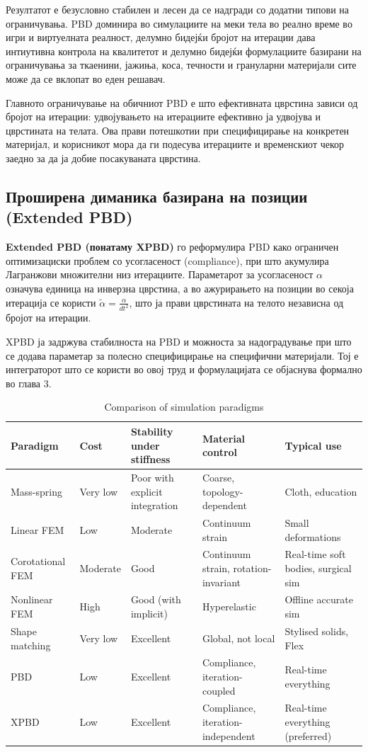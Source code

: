 Резултатот е безусловно стабилен и лесен да се надгради со додатни типови на ограничувања. PBD доминира во симулациите на меки тела во реално време во игри и виртуелната реалност, делумно бидејќи бројот на итерации дава интиутивна контрола на квалитетот и делумно бидејќи формулациите базирани на ограничувања за ткаенини, јажиња, коса, течности и грануларни материјали сите може да се вклопат во еден решавач.

Главното ограничување на обичниот PBD е што ефективната цврстина зависи од бројот на итерации: удвојувањето на итерациите ефективно ја удвојува и цврстината на телата. Ова прави потешкотии при специфицирање на конкретен материјал, и корисникот мора да ги подесува итерациите и временскиот чекор заедно за да ја добие посакуваната цврстина.

\subsection{Проширена диманика базирана на позиции (Extended PBD)}
\textbf{Extended PBD (понатаму XPBD)} го реформулира PBD како ограничен оптимизациски проблем со усогласеност (compliance), при што акумулира Лагранжови множителни низ итерациите. Параметарот за усогласеност $\alpha$ означува единица на инверзна цврстина, а во ажурирањето на позиции во секоја итерација се користи $\tilde{\alpha} = \frac{\alpha}{dt^2}$, што ја прави цврстината на телото независна од бројот на итерации. 

XPBD ја задржува стабилноста на PBD и можноста за надоградување при што се додава параметар за полесно специфицирање на специфични материјали. Тој е интеграторот што се користи во овој труд и формулацијата се објаснува формално во глава 3.

\begin{table}[h]
	\centering
	\begin{tabularx}{\textwidth}{lXXXX}
		\toprule
		\textbf{Paradigm} & \textbf{Cost} & \textbf{Stability under stiffness} & \textbf{Material control} & \textbf{Typical use} \\
		\midrule
		Mass-spring & Very low & Poor with explicit integration & Coarse, topology-dependent & Cloth, education \\
		Linear FEM & Low & Moderate & Continuum strain & Small deformations \\
		Corotational FEM & Moderate & Good & Continuum strain, rotation-invariant & Real-time soft bodies, surgical sim \\
		Nonlinear FEM & High & Good (with implicit) & Hyperelastic & Offline accurate sim \\
		Shape matching & Very low & Excellent & Global, not local & Stylised solids, Flex \\
		PBD & Low & Excellent & Compliance, iteration-coupled & Real-time everything \\
		XPBD & Low & Excellent & Compliance, iteration-independent & Real-time everything (preferred) \\
		\bottomrule
	\end{tabularx}
	\caption{Comparison of simulation paradigms}
	\label{tab:comparison}
\end{table}

